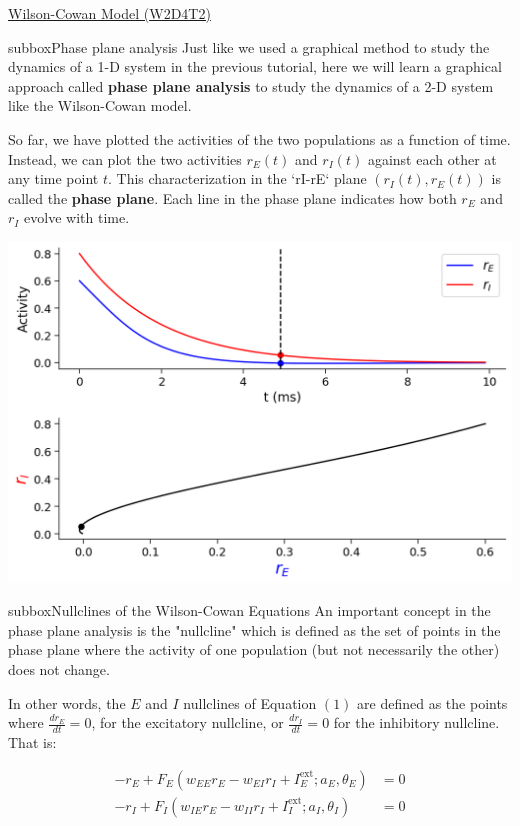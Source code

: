 \begin{textbox}{\href{https://compneuro.neuromatch.io/tutorials/W2D4_DynamicNetworks/chapter_title.html}{Wilson-Cowan Model (W2D4T2)} }
\begin{subbox}{subbox}{Phase plane analysis}
\scriptsize
Just like we used a graphical method to study the dynamics of a 1-D system in the previous tutorial, here we will learn a  graphical approach called \textbf{phase plane analysis} to study the dynamics of a 2-D system like the Wilson-Cowan model.

So far, we have plotted the activities of the two populations as a function of time. Instead, we can plot the two activities $r_E(t)$ and $r_I(t)$ against each other at any time point $t$. This characterization in the `rI-rE` plane $(r_I(t), r_E(t))$ is called the \textbf{phase plane}. Each line in the phase plane indicates how both $r_E$ and $r_I$ evolve with time.
\begin{center}
\includegraphics[scale=0.3]{Figures/DN/DN_Figure7.png}
\end{center}
\end{subbox}
\begin{subbox}{subbox}{Nullclines of the Wilson-Cowan Equations
}
\scriptsize
An important concept in the phase plane analysis is the "nullcline" which is defined as the set of points in the phase plane where the activity of one population (but not necessarily the other) does not change.

In other words, the $E$ and $I$ nullclines of Equation $(1)$ are defined as the points where $\displaystyle{\frac{dr_E}{dt}}=0$, for the excitatory nullcline, or $\displaystyle\frac{dr_I}{dt}=0$ for the inhibitory nullcline. That is:

\begin{align*}
-r_E + F_E(w_{EE}r_E -w_{EI}r_I + I^{\text{ext}}_E;a_E,\theta_E) &= 0  \\
-r_I + F_I(w_{IE}r_E -w_{II}r_I + I^{\text{ext}}_I;a_I,\theta_I) &= 0  
\end{align*}
\end{subbox}

\end{textbox}

